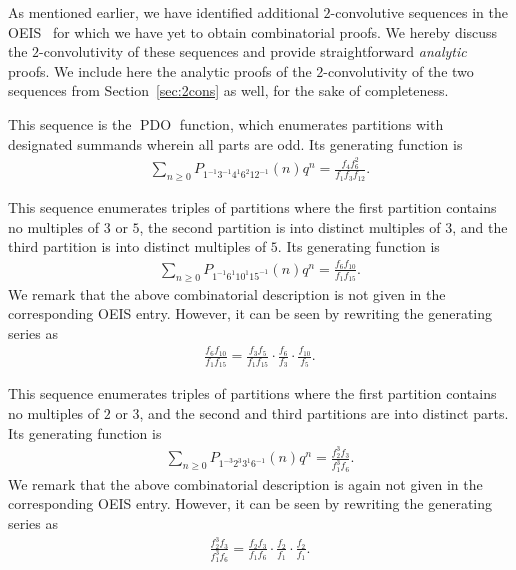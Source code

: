 \documentclass[12pt,reqno]{amsart}
\numberwithin{equation}{section}
\theoremstyle{plain}
\theoremstyle{definition}
\theoremstyle{named}
\newcommand{\PDO}{\operatorname{PDO}}
\begin{document}
As mentioned earlier, we have identified additional $2$-convolutive sequences in the OEIS~\cite{OEIS} for which we have yet to obtain combinatorial proofs. We hereby discuss the $2$-convolutivity of these sequences and provide straightforward \emph{analytic} proofs. We include here the analytic proofs of the $2$-convolutivity of the two sequences from Section~\ref{sec:2cons} as well, for the sake of completeness.
\begin{description}[itemsep=2pt]
	\item[A102186] This sequence is the $\PDO$ function, which enumerates partitions with designated summands wherein all parts are odd. Its generating function is
	\begin{align*}
		\sum_{n\ge 0} P_{1^{-1}3^{-1}4^{1}6^{2}12^{-1}}(n) q^n = \frac{f_4 f_6^2}{f_1 f_3 f_{12}}.
	\end{align*}
	
	\item[A094023] This sequence enumerates triples of partitions where the first partition contains no multiples of $3$ or $5$, the second partition is into distinct multiples of $3$, and the third partition is into distinct multiples of $5$. Its generating function is
	\begin{align*}
		\sum_{n\ge 0} P_{1^{-1} 6^1 10^{1} 15^{-1}}(n) q^n = \frac{f_6 f_{10}}{f_1 f_{15}}.
	\end{align*}
    We remark that the above combinatorial description is not given in the corresponding OEIS entry. However, it can be seen by rewriting the generating series as
	\begin{align*}
		\frac{f_6 f_{10}}{f_1 f_{15}} = \frac{f_3 f_5}{f_1 f_{15}} \cdot \frac{f_6}{f_3} \cdot \frac{f_{10}}{f_5}.
	\end{align*}

    \item[A128128] This sequence enumerates triples of partitions where the first partition contains no multiples of $2$ or $3$, and the second and third partitions are into distinct parts. Its generating function is
	\begin{align*}
		\sum_{n\ge 0} P_{1^{-3} 2^3 3^{1} 6^{-1}}(n) q^n = \frac{f_2^3 f_{3}}{f_1^3 f_{6}}.
	\end{align*}
    We remark that the above combinatorial description is again not given in the corresponding OEIS entry. However, it can be seen by rewriting the generating series as
	\begin{align*}
		\frac{f_2^3 f_{3}}{f_1^3 f_{6}} = \frac{f_2 f_3}{f_1f_6}  \cdot \frac{f_2}{f_1} \cdot \frac{f_2}{f_1}.
	\end{align*}   
\end{description}
\end{document}
